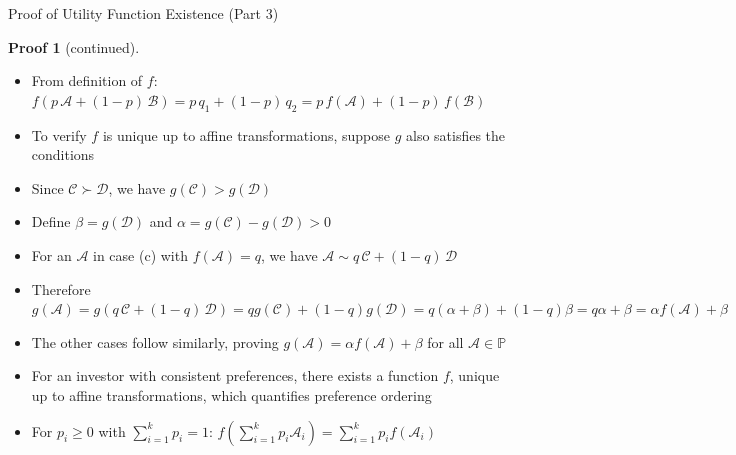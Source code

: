 \documentclass[10pt]{beamer}
\newcommand{\ds}{\displaystyle}
\theoremstyle{definition}
\newtheorem*{prf}{Proof}
\begin{document}
\begin{frame}{Proof of Utility Function Existence (Part 3)}
  \begin{prf}[continued]
    \begin{itemize}[<+->]
      \item From definition of $f$: $f(p\,\mathcal{A} + (1-p)\,\mathcal{B}) = p\,q_1 + (1-p)\,q_2 = p\,f(\mathcal{A}) + (1-p)\,f(\mathcal{B})$
      \item To verify $f$ is unique up to affine transformations, suppose $g$ also satisfies the conditions
      \item Since $\mathcal{C} \succ \mathcal{D}$, we have $g(\mathcal{C}) > g(\mathcal{D})$
      \item Define $\beta = g(\mathcal{D})$ and $\alpha = g(\mathcal{C})-g(\mathcal{D}) > 0$
      \item For an $\mathcal{A}$ in case (c) with $f(\mathcal{A}) = q$, we have $\mathcal{A} \sim q\,\mathcal{C} + (1-q)\,\mathcal{D}$
      \item Therefore $\ds g(\mathcal{A}) = g(q\,\mathcal{C} + (1-q)\,\mathcal{D}) = qg(\mathcal{C}) + (1-q)g(\mathcal{D}) = q(\alpha + \beta) + (1-q)\beta = q\alpha + \beta = \alpha f(\mathcal{A}) + \beta$
      \item The other cases follow similarly, proving $\ds g(\mathcal{A}) = \alpha f(\mathcal{A}) + \beta$ for all $\mathcal{A} \in \mathbb{P}$
    \end{itemize}
  \end{prf}
  
  \begin{itemize}[<+->]
    \item For an investor with consistent preferences, there exists a function $f$, unique up to affine transformations, which quantifies preference ordering
    \item For $p_i \geqslant 0$ with $\sum_{i=1}^k p_i = 1$: $f\left(\sum_{i=1}^k p_i \mathcal{A}_i\right) = \sum_{i=1}^k p_i f(\mathcal{A}_i)$
  \end{itemize}
\end{frame}
\end{document}
